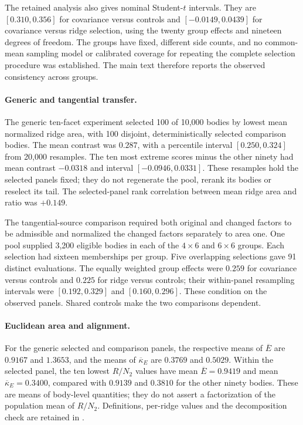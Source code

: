 The retained analysis also gives nominal Student-$t$ intervals. They are
$[0.310,0.356]$ for covariance versus controls and $[-0.0149,0.0439]$
for covariance versus ridge selection, using the twenty group effects
and nineteen degrees of freedom. The groups have fixed, different side
counts, and no common-mean sampling model or calibrated coverage for
repeating the complete selection procedure was established. The main text
therefore reports the observed consistency across groups.

\paragraph{Generic and tangential transfer.}
The generic ten-facet experiment selected 100 of 10,000 bodies by lowest
mean normalized ridge area, with 100 disjoint, deterministically selected
comparison bodies. The mean contrast was $0.287$, with a percentile
interval $[0.250,0.324]$ from 20,000 resamples. The ten most extreme
scores minus the other ninety had mean contrast $-0.0318$ and interval
$[-0.0946,0.0331]$. These resamples hold the selected panels fixed; they
do not regenerate the pool, rerank its bodies or reselect its tail.
The selected-panel rank correlation between mean ridge area and ratio
was $+0.149$.

The tangential-source comparison required both original and changed
factors to be admissible and normalized the changed factors separately to
area one. One pool supplied 3,200 eligible bodies in each of the
$4\times6$ and $6\times6$ groups. Each selection had sixteen memberships
per group. Five overlapping selections gave 91 distinct evaluations.
The equally weighted group effects were $0.259$ for covariance versus
controls and $0.225$ for ridge versus controls; their within-panel
resampling intervals were $[0.192,0.329]$ and $[0.160,0.296]$.
These condition on the observed panels. Shared controls make the two
comparisons dependent.

\paragraph{Euclidean area and alignment.}
For the generic selected and comparison panels, the respective means of
$\overline E$ are $0.9167$ and $1.3653$, and the means of
$\overline\kappa_E$ are $0.3769$ and $0.5029$. Within the selected
panel, the ten lowest $R/N_2$ values have mean $\overline E=0.9419$
and mean $\overline\kappa_E=0.3400$, compared with $0.9139$ and
$0.3810$ for the other ninety bodies. These are means of body-level
quantities; they do not assert a factorization of the population mean
of $R/N_2$. Definitions, per-ridge values and the decomposition check
are retained in
.

